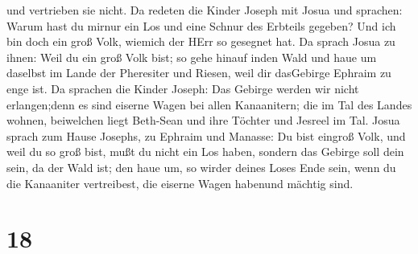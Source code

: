 und vertrieben sie nicht.  Da redeten die Kinder Joseph mit
Josua und sprachen: Warum hast du mirnur ein Los und eine Schnur des
Erbteils gegeben? Und ich bin doch ein groß Volk, wiemich der HErr so
gesegnet hat.  Da sprach Josua zu ihnen: Weil du ein groß
Volk bist; so gehe hinauf inden Wald und haue um daselbst im Lande der
Pheresiter und Riesen, weil dir dasGebirge Ephraim zu enge ist.
 Da sprachen die Kinder Joseph: Das Gebirge werden wir
nicht erlangen;denn es sind eiserne Wagen bei allen Kanaanitern; die im
Tal des Landes wohnen, beiwelchen liegt Beth-Sean und ihre Töchter und
Jesreel im Tal.  Josua sprach zum Hause Josephs, zu Ephraim
und Manasse: Du bist eingroß Volk, und weil du so groß bist, mußt du
nicht ein Los haben,  sondern das Gebirge soll dein sein,
da der Wald ist; den haue um, so wirder deines Loses Ende sein, wenn du
die Kanaaniter vertreibest, die eiserne Wagen habenund mächtig sind.

\hypertarget{section-17}{%
\section{18}\label{section-17}}

